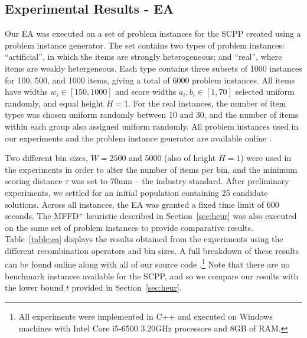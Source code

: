 \documentclass[a4paper,11pt,authoryear]{elsarticle}
\newcommand{\rev}[1]{{\color{myRed}#1}}
\begin{document}
\subsection{Experimental Results - EA}
\label{sub:expea}

\noindent Our EA was executed on a set of problem instances for the SCPP created using a problem instance generator. The set contains two types of problem instances: ``artificial'', in which the items are strongly heterogeneous; and ``real'', where items are weakly hetergeneous. Each type contains three subsets of 1000 instances for 100, 500, and 1000 items, giving a total of 6000 problem instances. All items have widths $w_i \in [150,1000]$ and score widths $a_i, b_i \in [1,70]$ selected uniform randomly, and equal height $H=1$. For the real instances, the number of item types was chosen uniform randomly between 10 and 30, and the number of items within each group also assigned uniform randomly. \rev{All problem instances used in our experiments and the problem instance generator are available online \citep{hawa2019inst}.}

Two different bin sizes, $W = 2500$ and 5000 (also of height $H=1$) were used in the experiments in order to alter the number of items per bin, and the minimum scoring distance $\tau$ was set to 70mm -- the industry standard. After preliminary experiments, we settled for an initial population containing 25 candidate solutions. Across all instances, the EA was granted a fixed time limit of 600 seconds. The MFFD$^+$ heuristic \rev{described} in Section~\ref{sec:heur} was also executed on the same set of problem instances to provide comparative results. Table~\ref{table:ea} displays the results obtained from the experiments using the different recombination operators and bin sizes. A full breakdown of these results can be found online along with all of our source code \citep{hawa2019ea}.\footnote{All experiments were implemented in C++ and executed on Windows machines with Intel Core i5-6500 3.20GHz processors and 8GB of RAM.} \rev{Note that there are no benchmark instances available for the SCPP, and so we compare our results with the lower bound $t$ provided in Section~\ref{sec:heur}.}
\end{document}
